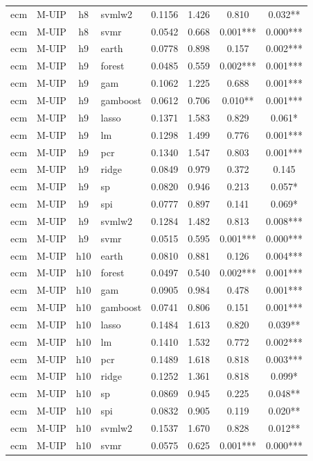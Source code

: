 \begin{ThreePartTable}
\begin{longtable}[t]{llclcccc}
ecm & M-UIP & h8 & svmlw2 & 0.1156 & 1.426 & 0.810 & 0.032**\\
ecm & M-UIP & h8 & svmr & 0.0542 & 0.668 & 0.001*** & 0.000***\\
\addlinespace
ecm & M-UIP & h9 & earth & 0.0778 & 0.898 & 0.157 & 0.002***\\
ecm & M-UIP & h9 & forest & 0.0485 & 0.559 & 0.002*** & 0.001***\\
ecm & M-UIP & h9 & gam & 0.1062 & 1.225 & 0.688 & 0.001***\\
ecm & M-UIP & h9 & gamboost & 0.0612 & 0.706 & 0.010** & 0.001***\\
ecm & M-UIP & h9 & lasso & 0.1371 & 1.583 & 0.829 & 0.061*\\
ecm & M-UIP & h9 & lm & 0.1298 & 1.499 & 0.776 & 0.001***\\
ecm & M-UIP & h9 & pcr & 0.1340 & 1.547 & 0.803 & 0.001***\\
ecm & M-UIP & h9 & ridge & 0.0849 & 0.979 & 0.372 & 0.145\\
ecm & M-UIP & h9 & sp & 0.0820 & 0.946 & 0.213 & 0.057*\\
ecm & M-UIP & h9 & spi & 0.0777 & 0.897 & 0.141 & 0.069*\\
ecm & M-UIP & h9 & svmlw2 & 0.1284 & 1.482 & 0.813 & 0.008***\\
ecm & M-UIP & h9 & svmr & 0.0515 & 0.595 & 0.001*** & 0.000***\\
\addlinespace
ecm & M-UIP & h10 & earth & 0.0810 & 0.881 & 0.126 & 0.004***\\
ecm & M-UIP & h10 & forest & 0.0497 & 0.540 & 0.002*** & 0.001***\\
ecm & M-UIP & h10 & gam & 0.0905 & 0.984 & 0.478 & 0.001***\\
ecm & M-UIP & h10 & gamboost & 0.0741 & 0.806 & 0.151 & 0.001***\\
ecm & M-UIP & h10 & lasso & 0.1484 & 1.613 & 0.820 & 0.039**\\
ecm & M-UIP & h10 & lm & 0.1410 & 1.532 & 0.772 & 0.002***\\
ecm & M-UIP & h10 & pcr & 0.1489 & 1.618 & 0.818 & 0.003***\\
ecm & M-UIP & h10 & ridge & 0.1252 & 1.361 & 0.818 & 0.099*\\
ecm & M-UIP & h10 & sp & 0.0869 & 0.945 & 0.225 & 0.048**\\
ecm & M-UIP & h10 & spi & 0.0832 & 0.905 & 0.119 & 0.020**\\
ecm & M-UIP & h10 & svmlw2 & 0.1537 & 1.670 & 0.828 & 0.012**\\
ecm & M-UIP & h10 & svmr & 0.0575 & 0.625 & 0.001*** & 0.000***\\

\end{longtable}
\end{ThreePartTable}

